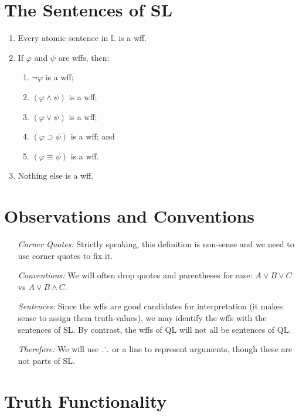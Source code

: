 \documentclass[a4paper, 11pt]{article} %
\def\therefore{\ensuremath{\ldotp\dot{}\,\ldotp}}
\begin{document}
\section*{The Sentences of SL}

\begin{enumerate}[leftmargin=1.5in,labelsep=.15in] %
  \item Every atomic sentence in $\mathbb{L}$ is a wff.
  \item If $\varphi$ and $\psi$ are wffs, then:
    \begin{enumerate}
      \item $\neg\varphi$ is a wff;
      \item $(\varphi\wedge\psi)$ is a wff;
      \item $(\varphi\vee\psi)$ is a wff;
      \item $(\varphi\supset\psi)$ is a wff; and
      \item $(\varphi\equiv\psi)$ is a wff.
    \end{enumerate}
  \item Nothing else is a wff.
\end{enumerate}




\section*{Observations and Conventions}

\begin{enumerate}[leftmargin=1.5in,labelsep=.15in] %
  \item[\it Corner Quotes:] Strictly speaking, this definition is non-sense and we need to use corner quotes to fix it.
  \item[\it Conventions:] We will often drop quotes and parentheses for ease: $A\vee B\vee C$ vs $A\vee B\wedge C$.
  \item[\it Sentences:] Since the wffs are good candidates for interpretation (it makes sense to assign them truth-values), we may identify the wffs with the sentences of SL. By contrast, the wffs of QL will not all be sentences of QL.
  \item[\it Therefore:] We will use $\therefore$ or a line to represent arguments, though these are not parts of SL.
\end{enumerate}




\section*{Truth Functionality}
\end{document}
